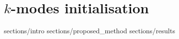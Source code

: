 \chapter{\(k\)-modes initialisation}
\graphicspath{{chapters/03/kmodes-init-paper/img/}}

{sections/intro}
{sections/proposed_method}
{sections/results}
